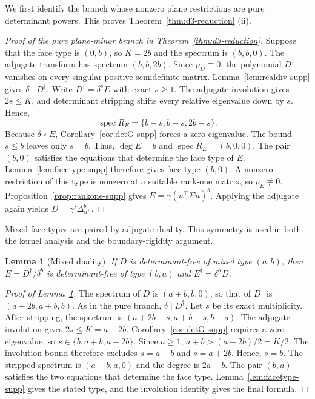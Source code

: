 \documentclass[12pt,a4paper]{article}
\theoremstyle{plain}
\newtheorem{lemma}{Lemma}
\theoremstyle{definition}
\newcommand{\spec}{\operatorname{spec}}
\begin{document}
We first identify the branch whose nonzero plane restrictions are pure determinant powers.
This proves Theorem~\ref{thm:d3-reduction} (ii).

\begin{proof}[Proof of the pure plane-minor branch in Theorem~\ref{thm:d3-reduction}]
    Suppose that the face type is $(0,b)$, so $K=2b$ and the spectrum is $(b,b,0)$.
    The adjugate transform has spectrum $(b,b,2b)$.
    Since $p_D\equiv0$, the polynomial $D^\dagger$ vanishes on every singular positive-semidefinite matrix.
    Lemma~\ref{lem:realdiv-supp} gives $\delta\mid D^\dagger$.
    Write $D^\dagger=\delta^sE$ with exact $s\ge1$.
    The adjugate involution gives $2s\le K$, and determinant stripping shifts every relative eigenvalue down by $s$.
    Hence,
    \begin{equation*}
        \spec R_E=\{b-s,b-s,2b-s\}
        .
    \end{equation*}
    Because $\delta\nmid E$, Corollary~\ref{cor:detG-supp} forces a zero eigenvalue.
    The bound $s\le b$ leaves only $s=b$.
    Thus, $\deg E=b$ and $\spec R_E=(b,0,0)$.
    The pair $(b,0)$ satisfies the equations that determine the face type of $E$.
    Lemma~\ref{lem:facetype-supp} therefore gives face type $(b,0)$.
    A nonzero restriction of this type is nonzero at a suitable rank-one matrix, so $p_E\not\equiv0$.
    Proposition~\ref{prop:rankone-supp} gives $E=\gamma(u^\top\Sigma u)^b$.
    Applying the adjugate again yields $D=\gamma'\Delta_{u^\perp}^b$.
\end{proof}

Mixed face types are paired by adjugate duality.
This symmetry is used in both the kernel analysis and the boundary-rigidity argument.

\begin{lemma}[Mixed duality]
\label{lem:mixed-duality-supp}
    If $D$ is determinant-free of mixed type $(a,b)$, then $E=D^\dagger/\delta^b$ is determinant-free of type $(b,a)$ and $E^\dagger=\delta^aD$.
\end{lemma}

\begin{proof}[Proof of Lemma~\ref{lem:mixed-duality-supp}]
    The spectrum of $D$ is $(a+b,b,0)$, so that of $D^\dagger$ is $(a+2b,a+b,b)$.
    As in the pure branch, $\delta\mid D^\dagger$.
    Let $s$ be its exact multiplicity.
    After stripping, the spectrum is $(a+2b-s,a+b-s,b-s)$.
    The adjugate involution gives $2s\le K=a+2b$.
    Corollary~\ref{cor:detG-supp} requires a zero eigenvalue, so $s\in\{b,a+b,a+2b\}$.
    Since $a\ge1$, $a+b>(a+2b)/2=K/2$.
    The involution bound therefore excludes $s=a+b$ and $s=a+2b$.
    Hence, $s=b$.
    The stripped spectrum is $(a+b,a,0)$ and the degree is $2a+b$.
    The pair $(b,a)$ satisfies the two equations that determine the face type.
    Lemma~\ref{lem:facetype-supp} gives the stated type, and the involution identity gives the final formula.
\end{proof}
\end{document}

